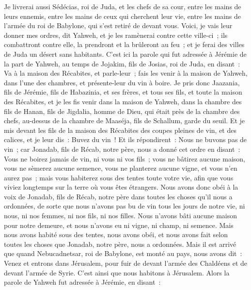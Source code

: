 \begin{multicols}{2}
Je livrerai aussi Sédécias, roi de Juda, et les chefs de sa cour, entre les mains de leurs ennemis, entre les mains de ceux qui cherchent leur vie, entre les mains de l'armée du roi de Babylone, qui s'est retiré de devant vous.
Voici, je vais leur donner mes ordres, dit Yahweh, et je les ramènerai contre cette ville-ci~; ils combattront contre elle, la prendront et la brûleront au feu~; et je ferai des villes de Juda un désert sans habitants.
\VerseOne{}C'est ici la parole qui fut adressée à Jérémie de la part de Yahweh, au temps de Jojakim, fils de Josias, roi de Juda, en disant~:
Va à la maison des Récabites, et parle-leur~; fais les venir à la maison de Yahweh, dans l'une des chambres, et présente-leur du vin à boire.
Je pris donc Jaazania, fils de Jérémie, fils de Habazinia, et ses frères, et tous ses fils, et toute la maison des Récabites,
et je les fis venir dans la maison de Yahweh, dans la chambre des fils de Hanan, fils de Jigdalia, homme de Dieu, qui était près de la chambre des chefs, au-dessus de la chambre de Maaséja, fils de Schallum, garde du seuil.
Et je mis devant les fils de la maison des Récabites des coupes pleines de vin, et des calices, et je leur dis~: Buvez du vin~!
Et ils répondirent~: Nous ne buvons pas de vin~; car Jonadab, fils de Récab, notre père, nous a donné cet ordre en disant~: Vous ne boirez jamais de vin, ni vous ni vos fils~;
vous ne bâtirez aucune maison, vous ne sèmerez aucune semence, vous ne planterez aucune vigne, et vous n'en aurez pas~; mais vous habiterez sous des tentes toute votre vie, afin que vous viviez longtemps sur la terre où vous êtes étrangers.
Nous avons donc obéi à la voix de Jonadab, fils de Récab, notre père dans toutes les choses qu'il nous a ordonnées, de sorte que nous n'avons pas bu de vin tous les jours de notre vie, ni nous, ni nos femmes, ni nos fils, ni nos filles.
Nous n'avons bâti aucune maison pour notre demeure, et nous n'avons eu ni vigne, ni champ, ni semence.
Mais nous avons habité sous des tentes, nous avons obéi, et nous avons fait selon toutes les choses que Jonadab, notre père, nous a ordonnées.
Mais il est arrivé que quand Nebucadnetsar, roi de Babylone, est monté au pays, nous avons dit~: Venez et entrons dans Jérusalem, pour fuir de devant l'armée des Chaldéens et de devant l'armée de Syrie. C'est ainsi que nous habitons à Jérusalem.
Alors la parole de Yahweh fut adressée à Jérémie, en disant~:

\end{multicols}
